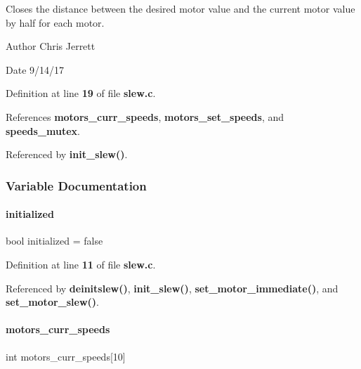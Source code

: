 Closes the distance between the desired motor value and the current motor value by half for each motor. 

\begin{DoxyAuthor}{Author}
Chris Jerrett 
\end{DoxyAuthor}
\begin{DoxyDate}{Date}
9/14/17 
\end{DoxyDate}


Definition at line \textbf{ 19} of file \textbf{ slew.\+c}.



References \textbf{ motors\+\_\+curr\+\_\+speeds}, \textbf{ motors\+\_\+set\+\_\+speeds}, and \textbf{ speeds\+\_\+mutex}.



Referenced by \textbf{ init\+\_\+slew()}.



\subsubsection{Variable Documentation}
\mbox{\label{slew_8c_aedeffc7d23da25d52b9a50045189fe2b}} 
\paragraph{initialized}
{\footnotesize\ttfamily bool initialized = false\hspace{0.3cm}{\ttfamily [static]}}



Definition at line \textbf{ 11} of file \textbf{ slew.\+c}.



Referenced by \textbf{ deinitslew()}, \textbf{ init\+\_\+slew()}, \textbf{ set\+\_\+motor\+\_\+immediate()}, and \textbf{ set\+\_\+motor\+\_\+slew()}.

\mbox{\label{slew_8c_a69e0d1204ea4d87b7366c9cd79527984}} 
\paragraph{motors\+\_\+curr\+\_\+speeds}
{\footnotesize\ttfamily int motors\+\_\+curr\+\_\+speeds[10]\hspace{0.3cm}{\ttfamily [static]}}



